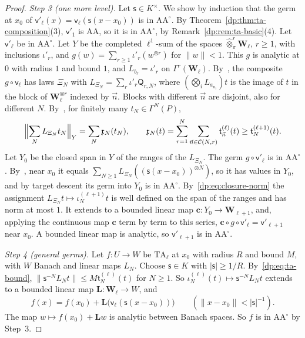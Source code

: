 \documentclass[11pt]{amsart}
\theoremstyle{definition}
\theoremstyle{remark}
\numberwithin{equation}{section}
\newcommand{\abs}[1]{\lvert #1\rvert}
\newcommand{\norm}[1]{\lVert #1\rVert}
\theoremstyle{plain}
\theoremstyle{definition}
\theoremstyle{plain}
\begin{document}
\begin{proof}
\emph{Step 3 (one more level).} Let $\mathsf s\in K^\times$. We show by induction that the germ at $x_0$ of $\mathsf v'_\ell(x)=\mathsf v_\ell(\mathsf s(x-x_0))$ is in $\mathrm{AA}^\circ$. By Theorem~\ref{dp:thm:ta-composition}(3), $\mathsf v'_1$ is AA, so it is in $\mathrm{AA}^\circ$, by Remark~\ref{dp:rem:ta-basic}(4). Let $\mathsf v'_\ell$ be in $\mathrm{AA}^\circ$. Let $Y$ be the completed $\ell^1$-sum of the spaces $\widehat\otimes^r_\pi\mathbf W_\ell$, $r\ge1$, with inclusions $\iota'_r$, and $g(w)=\sum_{r\ge1}\iota'_r(w^{\otimes r})$ for $\norm w<1$. This $g$ is analytic at $0$ with radius $1$ and bound $1$, and $L_{b_r}=\iota'_r$ on $\Gamma^r(\mathbf W_\ell)$. By~\cite[Lemma~Q.4]{I}, the composite $g\circ\mathsf v_\ell$ has laws $\Xi_N$ with $L_{\Xi_N}=\sum_r\iota'_r\mathsf Q_{r,N}$, where $(\bigotimes_iL_{a_{n_i}})t$ is the image of $t$ in the block of $\mathbf W_\ell^{\otimes r}$ indexed by $\vec n$. Blocks with different $\vec n$ are disjoint, also for different $N$. By~\cite[Lemma~Q.5(2),(1)]{I}, for finitely many $t_N\in\Gamma^N(P)$,
\begin{equation}\label{dp:eq:closure-norm}
 \Bigl\lVert\sum_NL_{\Xi_N}t_N\Bigr\rVert_Y=\sum_N\mathfrak x_N(t_N),\qquad
 \mathfrak x_N(t)=\sum_{r=1}^N\sum_{\vec n\in\mathcal C(N,r)}\mathfrak t^{(\ell)}_{\vec n}(t)\ge\mathfrak t^{(\ell+1)}_N(t).
\end{equation}
Let $Y_0$ be the closed span in $Y$ of the ranges of the $L_{\Xi_N}$. The germ $g\circ\mathsf v'_\ell$ is in $\mathrm{AA}^\circ$. By~\cite[Lemma~Q.3]{I}, near $x_0$ it equals $\sum_{N\ge1}L_{\Xi_N}((\mathsf s(x-x_0))^{\otimes N})$, so it has values in $Y_0$, and by target descent its germ into $Y_0$ is in $\mathrm{AA}^\circ$. By~\eqref{dp:eq:closure-norm} the assignment $L_{\Xi_N}t\mapsto\iota^{(\ell+1)}_Nt$ is well defined on the span of the ranges and has norm at most $1$. It extends to a bounded linear map $\mathbf c\colon Y_0\to\mathbf W_{\ell+1}$, and, applying the continuous map $\mathbf c$ term by term to this series, $\mathbf c\circ g\circ\mathsf v'_\ell=\mathsf v'_{\ell+1}$ near $x_0$. A bounded linear map is analytic, so $\mathsf v'_{\ell+1}$ is in $\mathrm{AA}^\circ$.

\emph{Step 4 (general germs).} Let $f\colon U\to W$ be $\mathrm{TA}_\ell$ at $x_0$ with radius $R$ and bound $M$, with $W$ Banach and linear maps $L_N$. Choose $\mathsf s\in K$ with $\abs{\mathsf s}\ge1/R$. By~\eqref{dp:eq:ta-bound}, $\norm{\mathsf s^{-N}L_Nt}\le M\mathfrak t^{(\ell)}_N(t)$ for $N\ge1$. So $\iota^{(\ell)}_N(t)\mapsto\mathsf s^{-N}L_Nt$ extends to a bounded linear map $\mathbf L\colon\mathbf W_\ell\to W$, and
\[
 f(x)=f(x_0)+\mathbf L\bigl(\mathsf v_\ell(\mathsf s(x-x_0))\bigr)\qquad(\norm{x-x_0}<\abs{\mathsf s}^{-1}).
\]
The map $w\mapsto f(x_0)+\mathbf Lw$ is analytic between Banach spaces. So $f$ is in $\mathrm{AA}^\circ$ by Step~3.
\end{proof}
\end{document}
